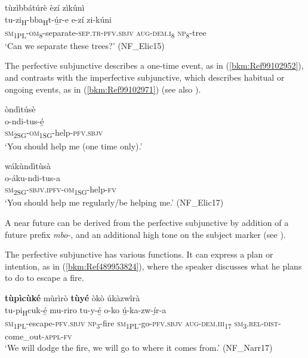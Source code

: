\ea
\label{bkm:Ref74908307}
tùzìbbátúrè èzí zìkûnì\\
\gll tu-zi\textsubscript{H}-bba\textsubscript{H}t-ú̲r-e        e-zí    zi-kúni\\
\textsc{sm}\-\textsubscript{1PL}-\textsc{om}\textsubscript{8}-separate-\textsc{sep}.\textsc{tr}-\textsc{pfv}.\textsc{sbjv}  \textsc{aug}-\textsc{dem}.\textsc{i}\textsubscript{8}  \textsc{np}\textsubscript{8}-tree\\
\glt ‘Can we separate these trees?’ (NF\_Elic15)
\z

The perfective subjunctive describes a one-time event, as in (\ref{bkm:Ref99102952}), and contrasts with the imperfective subjunctive, which describes habitual or ongoing events, as in (\ref{bkm:Ref99102971}) (see also ).

\ea
\label{bkm:Ref99102952}
\glll òndìtúsè\\
o-ndi-tus-é̲\\
\textsc{sm}\textsubscript{2SG}-\textsc{om}\textsubscript{1SG}-help-\textsc{pfv}.\textsc{sbjv}\\
\glt ‘You should help me (one time only).’
\z

\ea
\label{bkm:Ref99102971}
\glll wákùndìtùsà\\
o-áku-ndi-tus-a\\
\textsc{sm}\textsubscript{2SG}-\textsc{sbjv}.\textsc{ipfv}-\textsc{om}\textsubscript{1SG}-help-\textsc{fv}\\
\glt ‘You should help me regularly/be helping me.’ (NF\_Elic17)
\z

A near future can be derived from the perfective subjunctive by addition of a future prefix \textit{mbo-}, and an additional high tone on the subject marker (see ).

The perfective subjunctive has various functions. It can express a plan or intention, as in (\ref{bkm:Ref489953824}), where the speaker discusses what he plans to do to escape a fire.

\ea
\label{bkm:Ref489953824}
\textbf{tùpìcùké} mùrìrò \textbf{tùyé} òkò úkàzwîrà\\
\gll tu-pi\textsubscript{H}cuk-é̲      mu-riro tu-y-é̲      o-ko    ú̲-ka-zw-í̲r-a\\
\textsc{sm}\textsubscript{1PL}-escape-\textsc{pfv}.\textsc{sbjv}  \textsc{np}\textsubscript{3}-fire
\textsc{sm}\textsubscript{1PL}-go-\textsc{pfv}.\textsc{sbjv}  \textsc{aug}-\textsc{dem}.\textsc{iii}\textsubscript{17}  \textsc{sm}\textsubscript{3}.\textsc{rel}-\textsc{dist}-come\_out-\textsc{appl}-\textsc{fv}\\
\glt ‘We will dodge the fire, we will go to where it comes from.’ (NF\_Narr17)
\z

